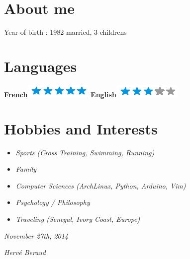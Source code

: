 \documentclass[]{friggeri-cv}
\begin{document}
\begin{aside}
  \section{About me}
    Year of birth : 1982
    married, 3 childrens 
    ~
  \section{Languages}
    \textbf{French}\includegraphics[scale=0.40]{img/5stars.png}
    \textbf{English}\includegraphics[scale=0.40]{img/3stars.png}
\end{aside}

\section{Hobbies and Interests}
\begin {itemize}
    \item \emph {Sports (Cross Training, Swimming, Running)}
    \item \emph {Family}
    \item \emph {Computer Sciences (ArchLinux, Python, Arduino, Vim)}
    \item \emph {Psychology / Philosophy}
    \item \emph {Traveling (Senegal, Ivory Coast, Europe)}
\end {itemize}

\begin{flushleft}
\emph{November 27th, 2014}
\end{flushleft}
\begin{flushright}
\emph{Hervé Beraud}
\end{flushright}
\end{document}

